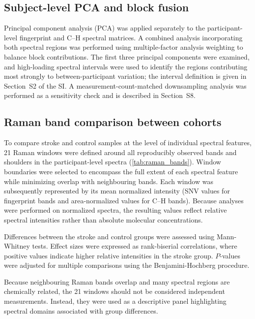\documentclass[preprint,12pt]{elsarticle}
\begin{document}
\subsection{Subject-level PCA and block fusion} 
\label{subsec:biopca}

Principal component analysis (PCA) was applied separately to the participant-level fingerprint and C--H spectral matrices. A combined analysis incorporating both spectral regions was performed using multiple-factor analysis weighting to balance block contributions. The first three principal components were examined, and high-loading spectral intervals were used to identify the regions contributing most strongly to between-participant variation; the interval definition is given in Section~S2 of the SI. A measurement-count-matched downsampling analysis was performed as a sensitivity check and is described in Section~S8.


\subsection{Raman band comparison between cohorts} 
\label{subsec:band_analysis}

To compare stroke and control samples at the level of individual spectral features, 21 Raman windows were defined around all reproducibly observed bands and shoulders in the participant-level spectra (\cref{tab:raman_bands}). Window boundaries were selected to encompass the full extent of each spectral feature while minimizing overlap with neighbouring bands. Each window was subsequently represented by its mean normalized intensity (SNV values for fingerprint bands and area-normalized values for C--H bands). Because analyses were performed on normalized spectra, the resulting values reflect relative spectral intensities rather than absolute molecular concentrations.

Differences between the stroke and control groups were assessed using Mann-Whitney tests. Effect sizes were expressed as rank-biserial correlations, where positive values indicate higher relative intensities in the stroke group. $P$-values were adjusted for multiple comparisons using the Benjamini-Hochberg procedure.

Because neighbouring Raman bands overlap and many spectral regions are chemically related, the 21 windows should not be considered independent measurements. Instead, they were used as a descriptive panel highlighting spectral domains associated with group differences.
\end{document}
